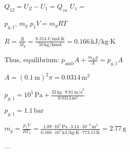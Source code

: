 \( Q_{12} = U_{Z} - U_{1} = Q_{zu} \)  
\( U_{1} = \)

\( p_{g,1} \), \( m_g \)  
\( p_1 V = m_g R T \)  

\( R = \frac{\bar{R}}{M_g} = \frac{8.314 \, \text{J/mol·K}}{50 \, \text{kg/kmol}} = 0.166 \, \text{kJ/kg·K} \)  

Thus, equilibrium:  
\( p_{\text{amb}} A + \frac{m_K g}{A} = p_{g,1} A \)  

\( A = (0.1 \, \text{m})^2 \pi = 0.0314 \, \text{m}^2 \)  

\( p_{g,1} = 10^5 \, \text{Pa} + \frac{32 \, \text{kg} \cdot 9.81 \, \text{m/s}^2}{0.0314 \, \text{m}^2} \)  

\( p_{g,1} = 1.1 \, \text{bar} \)  

\( m_g = \frac{p_1 V}{R T_1} = \frac{1.09 \cdot 10^5 \, \text{Pa} \cdot 3.14 \cdot 10^{-3} \, \text{m}^3}{0.166 \cdot 10^3 \, \text{kJ/kg·K} \cdot 773.15 \, \text{K}} = 2.77 \, \text{g} \)  

---